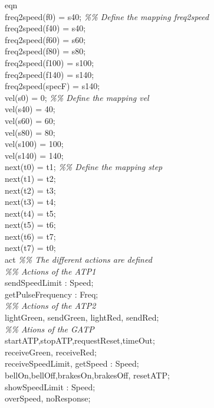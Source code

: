\documentclass[11pt,a4paper]{article}
\begin{document}
eqn\\

	freq2speed(f0) = s40;                             \textit{\%\% Define the mapping freq2speed}\\
	freq2speed(f40) = s40;  \\                          
	freq2speed(f60) = s60;   \\
	freq2speed(f80) = s80;\\
	freq2speed(f100) = s100;\\
	freq2speed(f140) = s140;\\
	freq2speed(specF) = s140; \\                         
	vel(s0) = 0;                                      \textit{\%\% Define the mapping vel}\\
	vel(s40) = 40;\\
	vel(s60) = 60;\\
	vel(s80) = 80;\\
	vel(s100) = 100;\\
	vel(s140) = 140;\\
	next(t0) = t1;                                    \textit{\%\% Define the mapping step}\\
	next(t1) = t2;\\
	next(t2) = t3;\\
	next(t3) = t4;\\
	next(t4) = t5;\\
	next(t5) = t6;\\
	next(t6) = t7;\\
	next(t7) = t0;\\


act        \textit{\%\% The different actions are defined} \\

	\textit{\%\% Actions of the ATP1}\\

	sendSpeedLimit : Speed; \\
	getPulseFrequency : Freq; \\
	
	\textit{\%\% Actions of the ATP2}\\
	
	lightGreen, sendGreen, lightRed, sendRed; \\
	
	\textit{\%\% Ations of the GATP}\\

	startATP,stopATP,requestReset,timeOut; \\
	receiveGreen, receiveRed;\\
	receiveSpeedLimit, getSpeed : Speed;\\
	bellOn,bellOff,brakesOn,brakesOff, resetATP;\\
	showSpeedLimit : Speed;\\
	overSpeed, noResponse;\\
\end{document}
